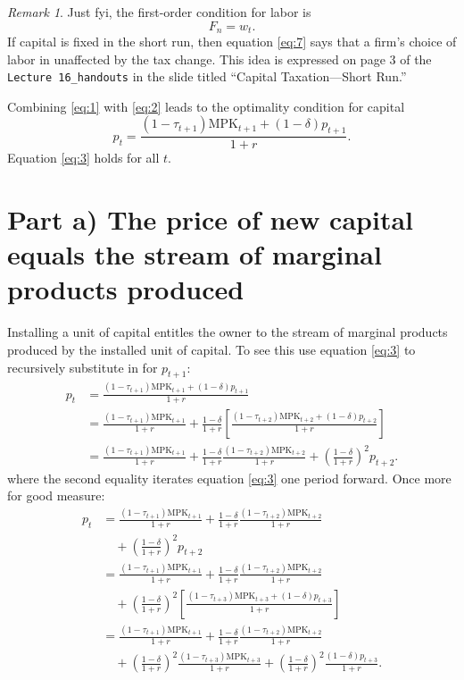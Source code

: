 \documentclass[12pt]{pracjourn_rwr}
\newcounter{ryan}
\theoremstyle{definition}
\theoremstyle{remark}
\newtheorem{remark}{Remark}[ryan]
\begin{document}
\begin{remark}
\label{remark:1}
Just fyi, the first-order condition for labor is
\begin{equation}
\label{eq:7}
F_{n} = w_{t}.
\end{equation}
If capital is fixed in the short run,
then equation \eqref{eq:7} says that a firm's choice of labor in unaffected by the tax change.
This idea is expressed on page 3 of the \texttt{Lecture 16\_handouts} in the slide titled
``Capital Taxation---Short Run.''
\end{remark}

Combining \eqref{eq:1} with \eqref{eq:2} leads to the optimality condition for capital
\begin{equation}
\label{eq:3}
p_{t} = \frac{(1-\tau_{t+1}) \text{MPK}_{t+1} + (1-\delta)p_{t+1}}{1+r}.
\end{equation}
Equation \eqref{eq:3} holds for all $t$.

\section{Part a) The price of new capital equals the stream of marginal products produced}

Installing a unit of capital entitles the owner to the stream of marginal products produced by the installed unit of capital.
To see this use equation \eqref{eq:3} to recursively substitute in for $p_{t+1}$:
\begin{align*}
p_{t} &= \frac{(1-\tau_{t+1}) \text{MPK}_{t+1} + (1-\delta)p_{t+1}}{1+r} \\
&= \frac{(1-\tau_{t+1}) \text{MPK}_{t+1}}{1+r} + \frac{1-\delta}{1+r}
\left[ \frac{(1-\tau_{t+2}) \text{MPK}_{t+2} + (1-\delta)p_{t+2}}{1+r} \right] \\
&= \frac{(1-\tau_{t+1}) \text{MPK}_{t+1}}{1+r} + \frac{1-\delta}{1+r} \frac{(1-\tau_{t+2}) \text{MPK}_{t+2}}{1+r} +
\left( \frac{1-\delta}{1+r}  \right)^{2} p_{t+2}.
\end{align*}
where the second equality iterates equation \eqref{eq:3} one period forward.
Once more for good measure:
\begin{align*}
p_{t} &= \frac{(1-\tau_{t+1}) \text{MPK}_{t+1}}{1+r} + \frac{1-\delta}{1+r} \frac{(1-\tau_{t+2}) \text{MPK}_{t+2}}{1+r} \\
&\quad + \left( \frac{1-\delta}{1+r}  \right)^{2} p_{t+2} \\
&= \frac{(1-\tau_{t+1}) \text{MPK}_{t+1}}{1+r} + \frac{1-\delta}{1+r} \frac{(1-\tau_{t+2}) \text{MPK}_{t+2}}{1+r} \\
&\quad + \left( \frac{1-\delta}{1+r}  \right)^{2} \left[ \frac{(1-\tau_{t+3}) \text{MPK}_{t+3} + (1-\delta)p_{t+3}}{1+r} \right] \\
&= \frac{(1-\tau_{t+1}) \text{MPK}_{t+1}}{1+r} + \frac{1-\delta}{1+r} \frac{(1-\tau_{t+2}) \text{MPK}_{t+2}}{1+r} \\
&\quad + \left( \frac{1-\delta}{1+r}  \right)^{2} \frac{(1-\tau_{t+3}) \text{MPK}_{t+3}}{1+r}
+ \left( \frac{1-\delta}{1+r}  \right)^{2} \frac{(1-\delta)p_{t+3}}{1+r}.
\end{align*}
\end{document}

